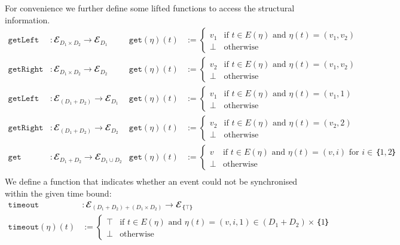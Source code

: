 For convenience we further define some lifted functions to access the structural information.
\begin{align*}
  \mathtt{getLeft}&: 𝓔_{D_1×D_2} → 𝓔_{D_1}
    & \mathtt{get}(η)(t) &:= \begin{cases}
        v_1 & \text{if } t∈E(η) \text{ and } η(t) = (v_1,v_2)\\
        ⊥ & \text{otherwise}
      \end{cases}\\
%
  \mathtt{getRight}&: 𝓔_{D_1×D_2} → 𝓔_{D_2}
    & \mathtt{get}(η)(t) &:= \begin{cases}
        v_2 & \text{if } t∈E(η) \text{ and } η(t) = (v_1,v_2)\\
        ⊥ & \text{otherwise}
      \end{cases}\\
%      
  \mathtt{getLeft}&: 𝓔_{(D_1+D_2)} → 𝓔_{D_1}
    & \mathtt{get}(η)(t) &:= \begin{cases}
        v_1 & \text{if } t∈E(η) \text{ and } η(t) = (v_1,1)\\
        ⊥ & \text{otherwise}
      \end{cases}\\
%
  \mathtt{getRight}&: 𝓔_{(D_1+D_2)} → 𝓔_{D_2}
    & \mathtt{get}(η)(t) &:= \begin{cases}
        v_2 & \text{if } t∈E(η) \text{ and } η(t) = (v_2,2)\\
        ⊥ & \text{otherwise}
      \end{cases}\\
%
  \mathtt{get}&: 𝓔_{D_1+D_2} → 𝓔_{D_1∪D_2}
    & \mathtt{get}(η)(t) &:= \begin{cases}
        v & \text{if } t∈E(η) \text{ and } η(t) = (v,i) \text{ for } i∈｛1,2｝\\
        ⊥ & \text{otherwise}
      \end{cases}\\
\end{align*}
%
We define a function that indicates whether an event could not be synchronised within the given time bound:
\begin{align*}
  \mathtt{timeout}&: 𝓔_{(D_1+D_2)+(D_1×D_2)} → 𝓔_{｛⊤｝}\\
   \mathtt{timeout}(η)(t) & := \begin{cases}
            ⊤ & \text{if } t∈E(η) \text{ and } η(t) = (v,i,1)∈(D_1+D_2)×｛1｝\\
            ⊥ & \text{otherwise}
          \end{cases}\\
\end{align*}
